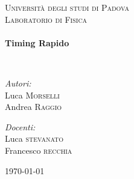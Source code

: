\begin{titlepage}
\begin{center}


\textsc{\LARGE Università degli studi di Padova}\\[1.5cm]

\textsc{\Large Laboratorio di Fisica}\\[0.5cm]

\HRule \\[0.4cm]
{ \huge \bfseries Timing Rapido \\ [0.4cm] }

\HRule \\[1.5cm]

\noindent
\begin{minipage}{0.4\textwidth}
\begin{flushleft} \large
\emph{Autori:}\\
Luca \textsc{Morselli}\\
Andrea \textsc{Raggio}\\
\end{flushleft}
\end{minipage}%
\begin{minipage}{0.4\textwidth}
\begin{flushright} \large
\emph{Docenti:} \\
Luca \textsc{stevanato}\\
Francesco \textsc{recchia}\\
\end{flushright}
\end{minipage}

\vfill

{\large \today}

\end{center}
\end{titlepage}
